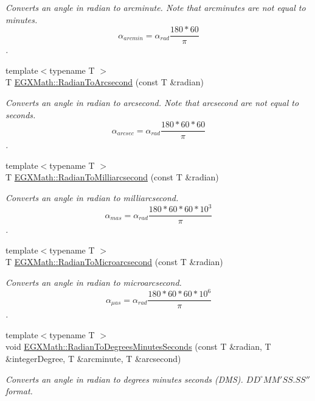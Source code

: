 \begin{DoxyCompactItemize}
\begin{DoxyCompactList}\small\item\em Converts an angle in radian to arcminute. Note that arcminutes are not equal to minutes. \[\alpha_{arcmin}=\alpha_{rad}\frac{180 * 60}{\pi}\]. \end{DoxyCompactList}\item 
{\footnotesize template$<$typename T $>$ }\\T \mbox{\hyperlink{group___e_g_x_math-_angle_conversions-_radian_ga2f952f6675a0fc54bf72bfe4e3d2664a}{E\+G\+X\+Math\+::\+Radian\+To\+Arcsecond}} (const T \&radian)
\begin{DoxyCompactList}\small\item\em Converts an angle in radian to arcsecond. Note that arcsecond are not equal to seconds. \[\alpha_{arcsec}=\alpha_{rad}\frac{180 * 60 * 60}{\pi}\]. \end{DoxyCompactList}\item 
{\footnotesize template$<$typename T $>$ }\\T \mbox{\hyperlink{group___e_g_x_math-_angle_conversions-_radian_ga84fbb494a455cfeb30be62776f96c9a9}{E\+G\+X\+Math\+::\+Radian\+To\+Milliarcsecond}} (const T \&radian)
\begin{DoxyCompactList}\small\item\em Converts an angle in radian to milliarcsecond. \[\alpha_{mas}=\alpha_{rad}\frac{180 * 60 * 60 * 10^3}{\pi}\]. \end{DoxyCompactList}\item 
{\footnotesize template$<$typename T $>$ }\\T \mbox{\hyperlink{group___e_g_x_math-_angle_conversions-_radian_ga3a515ca2838a305fa40750763f546a86}{E\+G\+X\+Math\+::\+Radian\+To\+Microarcsecond}} (const T \&radian)
\begin{DoxyCompactList}\small\item\em Converts an angle in radian to microarcsecond. \[\alpha_{\mu as}=\alpha_{rad}\frac{180 * 60 * 60 * 10^6}{\pi}\]. \end{DoxyCompactList}\item 
{\footnotesize template$<$typename T $>$ }\\void \mbox{\hyperlink{group___e_g_x_math-_angle_conversions-_radian_gadae98c255924fdc8b232b6539eae81a9}{E\+G\+X\+Math\+::\+Radian\+To\+Degrees\+Minutes\+Seconds}} (const T \&radian, T \&integer\+Degree, T \&arcminute, T \&arcsecond)
\begin{DoxyCompactList}\small\item\em Converts an angle in radian to degrees minutes seconds (D\+MS). ${DD}^{\circ}{MM}'{SS.SS}''$ format. \end{DoxyCompactList}\item 

\end{DoxyCompactItemize}
